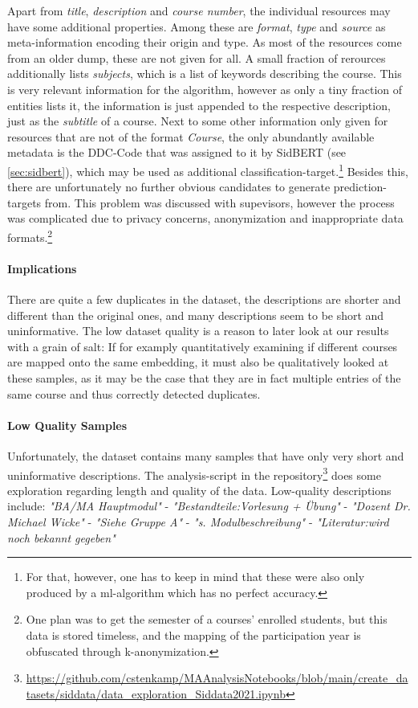 Apart from \textit{title}, \textit{description} and \textit{course number}, the individual resources may have some additional properties. Among these are \textit{format}, \textit{type} and \textit{source} as meta-information encoding their origin and type. As most of the resources come from an older dump, these are not given for all. A small fraction of rerources additionally lists \textit{subjects}, which is a list of keywords describing the course. This is very relevant information for the algorithm, however as only a tiny fraction of entities lists it, the information is just appended to the respective description, just as the \textit{subtitle} of a course. Next to some other information only given for resources that are not of the format \textit{Course}, the only abundantly available metadata is the DDC-Code that was assigned to it by SidBERT (see \autoref{sec:sidbert}), which may be used as additional classification-target.\footnote{For that, however, one has to keep in mind that these were also only produced by a \gls{ml}-algorithm which has no perfect accuracy.} Besides this, there are unfortunately no further obvious candidates to generate prediction-targets from. This problem was discussed with \my supevisors, however the process was complicated due to privacy concerns, anonymization and inappropriate data formats.\footnote{One plan was to get the semester of a courses' enrolled students, but this data is stored timeless, and the mapping of the participation year is obfuscated through k-anonymization.}


\paragraph{Implications} There are quite a few duplicates in the dataset, the descriptions are shorter and different than the original ones, and many descriptions seem to be short and uninformative. The low dataset quality is a reason to later look at our results with a grain of salt: If for examply quantitatively examining if different courses are mapped onto the same embedding, it must also be qualitatively looked at these samples, as it may be the case that they are in fact multiple entries of the same course and thus correctly detected duplicates.

\paragraph{Low Quality Samples}
Unfortunately, the dataset contains many samples that have only very short and uninformative descriptions. The analysis-script in the repository\footnote{\url{https://github.com/cstenkamp/MAAnalysisNotebooks/blob/main/create_datasets/siddata/data_exploration_Siddata2021.ipynb}} does some exploration regarding length and quality of the data. Low-quality descriptions include: \textit{"BA/MA Hauptmodul"} - \textit{"Bestandteile:Vorlesung + Übung"} - \textit{"Dozent  Dr. Michael Wicke"} - \textit{"Siehe Gruppe A"} - \textit{"s. Modulbeschreibung"} - \textit{"Literatur:wird noch bekannt gegeben"}


